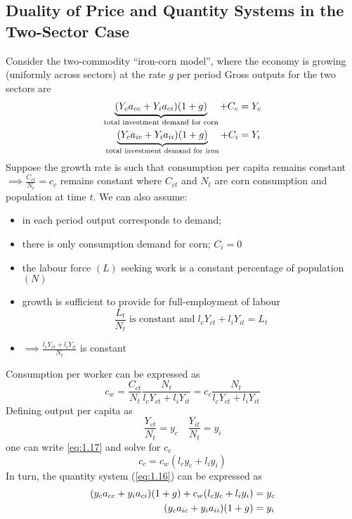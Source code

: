\documentclass{article}
\begin{document}
\subsection{Duality of Price and Quantity Systems in the Two-Sector Case}
	Consider the two-commodity ``iron-corn model'', where the economy is growing (uniformly across sectors) at the rate \( g \) per period
	Gross outputs for the two sectors are
	\begin{align}
		\underbrace{(Y_c a_{cc} + Y_i a_{ci})(1+g)}_{\text{total investment demand for corn}} + C_c &= Y_c \notag\\
		\underbrace{(Y_c a_{ic} + Y_i a_{ii})(1+g)}_{\text{total investment demand for iron}} + C_i &= Y_i \label{eq:1.16}
	\end{align}
	Suppose the growth rate is such that consumption per capita remains constant \( \implies \frac{C_{ct}}{N_t} = c_c \) remains constant where \( C_{ct} \) and \( N_t \) are corn consumption and population at time \( t \). We can also assume:
	\begin{itemize}
		\item in each period output corresponds to demand;
		\item there is only consumption demand for corn; \( C_i = 0 \)
		\item the labour force \( (L) \)  seeking work is a constant percentage of population \( (N) \)
		\item growth is sufficient to provide for full-employment of labour
		\[
			\frac{L_t}{N_t} \;\text{is constant and}\; l_c Y_{ct} + l_i Y_{it} = L_t
		\]
		\item \( \implies \frac{l_c Y_{ct} + l_i Y_{it}}{N_t} \) is constant
	\end{itemize}
	Consumption per worker can be expressed as
	\begin{equation}
		c_w = \frac{C_{ct}}{N_t}\frac{N_t}{l_c Y_{ct} + l_i Y_{it}} = c_c \frac{N_t}{l_c Y_{ct} + l_i Y_{it}} \label{eq:1.17}
	\end{equation}
	Defining output per capita as
	\[
		\frac{Y_{ct}}{N_t} = y_c \quad \frac{Y_{it}}{N_t} = y_i
	\]
	one can write \cref{eq:1.17} and solve for \( c_c \)
	\begin{equation}
		c_c = c_w(l_c y_c + l_i y_i) \label{eq:1.18}
	\end{equation}
	In turn, the quantity system (\ref{eq:1.16}) can be expressed as 
	\begin{align}
		(y_c a_{cc} + y_i a_{ci})(1+g) + c_w (l_c y_c + l_i y_i) &= y_c \notag \\
		(y_c a_{ic} + y_i a_{ii})(1+g) &= y_i \label{eq:1.19}
	\end{align}
\end{document}
